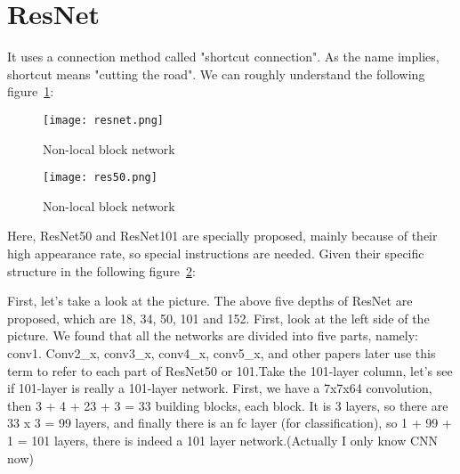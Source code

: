 \documentclass[10pt,letterpaper]{article}
\begin{document}
\section{ResNet}
It uses a connection method called "shortcut connection". As the name implies, shortcut means "cutting the road". We can roughly understand the following figure~\ref{f2}:
 \begin{figure}[!htb]
 	\centering
 	\texttt{[image: resnet.png]}\\
 	\caption{Non-local block network}\label{f2}
 \end{figure}
  \begin{figure}[!htb]
  	\centering
  	\texttt{[image: res50.png]}\\
  	\caption{Non-local block network}\label{f3}
  \end{figure}
\par Here, ResNet50 and ResNet101 are specially proposed, mainly because of their high appearance rate, so special instructions are needed. Given their specific structure in the following figure~\ref{f3}:
\par First, let's take a look at the picture. The above five depths of ResNet are proposed, which are 18, 34, 50, 101 and 152. First, look at the left side of the picture. We found that all the networks are divided into five parts, namely: conv1. Conv2\_x, conv3\_x, conv4\_x, conv5\_x, and other papers later use this term to refer to each part of ResNet50 or 101.Take the 101-layer column, let's see if 101-layer is really a 101-layer network. First, we have a 7x7x64 convolution, then 3 + 4 + 23 + 3 = 33 building blocks, each block. It is 3 layers, so there are 33 x 3 = 99 layers, and finally there is an fc layer (for classification), so 1 + 99 + 1 = 101 layers, there is indeed a 101 layer network.(Actually I only know CNN now)
\end{document}
